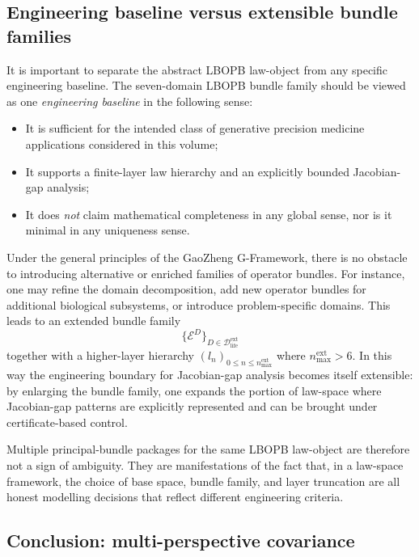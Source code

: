 \documentclass[11pt]{book}
\theoremstyle{plain}
\theoremstyle{definition}
\theoremstyle{remark}
\begin{document}
\subsection{Engineering baseline versus extensible bundle families}

It is important to separate the abstract LBOPB law-object from any
specific engineering baseline.
The seven-domain LBOPB bundle family should be viewed as one
\emph{engineering baseline} in the following sense:
\begin{itemize}
  \item It is sufficient for the intended class of generative precision
        medicine applications considered in this volume;
  \item It supports a finite-layer law hierarchy and an explicitly
        bounded Jacobian-gap analysis;
  \item It does \emph{not} claim mathematical completeness in any
        global sense, nor is it minimal in any uniqueness sense.
\end{itemize}

Under the general principles of the GaoZheng G-Framework, there is no
obstacle to introducing alternative or enriched families of operator
bundles.
For instance, one may refine the domain decomposition, add new operator
bundles for additional biological subsystems, or introduce
problem-specific domains.
This leads to an extended bundle family
\[
  \{\mathcal{E}^{D}\}_{D\in\mathcal{D}_{\mathrm{life}}^{\mathrm{ext}}}
\]
together with a higher-layer hierarchy
\((l_n)_{0\le n\le n_{\max}^{\mathrm{ext}}}\) where
\(n_{\max}^{\mathrm{ext}} > 6\).
In this way the engineering boundary for Jacobian-gap analysis becomes
itself extensible: by enlarging the bundle family, one expands the
portion of law-space where Jacobian-gap patterns are explicitly
represented and can be brought under certificate-based control.

Multiple principal-bundle packages for the same LBOPB law-object are
therefore not a sign of ambiguity.
They are manifestations of the fact that, in a law-space framework, the
choice of base space, bundle family, and layer truncation are all
honest modelling decisions that reflect different engineering criteria.



\subsection{Conclusion: multi-perspective covariance}
\end{document}
